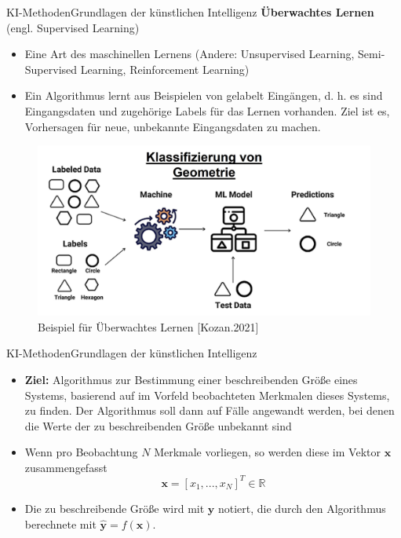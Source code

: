 \documentclass[169, handout	]{THIbeamer} %
\begin{document}
	\begin{frame}{KI-Methoden}{Grundlagen der künstlichen Intelligenz}
		\small	
		\textbf{Überwachtes Lernen} (engl. Supervised Learning)	
		\footnotesize
		\begin{itemize}
			\item Eine Art des maschinellen Lernens (Andere: Unsupervised Learning, Semi-Supervised Learning, Reinforcement Learning)
			\item Ein Algorithmus lernt aus Beispielen von gelabelt Eingängen, d. h. es sind Eingangsdaten und zugehörige Labels
für das Lernen vorhanden. Ziel ist es, Vorhersagen für neue, unbekannte Eingangsdaten zu machen.
		\end{itemize}
		\begin{figure}
			\includegraphics[scale=0.3]{required/supervised_learning.jpg}
			\caption{Beispiel für Überwachtes Lernen [Kozan.2021]}
        	\label{Ground Subtraction}
       	\end{figure}
	\end{frame}

	\begin{frame}{KI-Methoden}{Grundlagen der künstlichen Intelligenz}
		\begin{itemize}
			\item \textbf{Ziel:} Algorithmus zur Bestimmung einer beschreibenden Größe eines Systems, basierend auf im Vorfeld beobachteten Merkmalen dieses Systems, zu finden. Der Algorithmus soll dann auf Fälle angewandt werden, bei denen die Werte der zu beschreibenden Größe unbekannt sind
			\item Wenn pro Beobachtung $N$ Merkmale vorliegen, so werden diese im Vektor $\mathbf{x}$ zusammengefasst
			\begin{equation}
				\mathbf{x} = [x_1,..., x_{N}]^{T} \in \mathbb{R}
			\end{equation}
			\item Die zu beschreibende Größe wird mit $\mathbf{y}$ notiert, die durch den Algorithmus berechnete mit $\hat{\mathbf{y}} = f(\mathbf{x})$.
		\end{itemize}	
	\end{frame}
\end{document}
